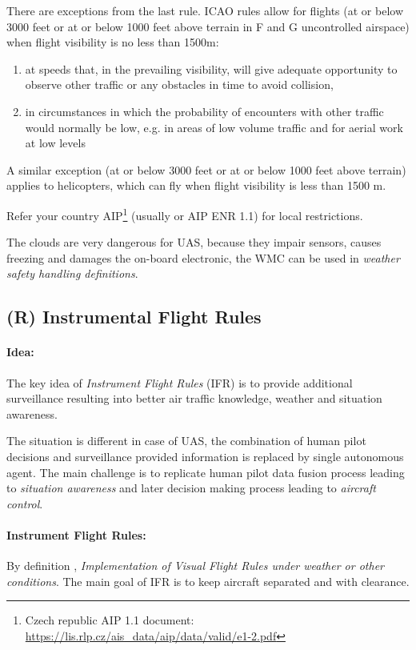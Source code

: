 There are exceptions from the last rule. ICAO rules allow for flights (at or below 3000 feet or at or below 1000 feet above terrain in F and G uncontrolled airspace) when flight visibility is no less than 1500m:
\begin{enumerate}
    \item at speeds that, in the prevailing visibility, will give adequate opportunity to observe other traffic or any obstacles in time to avoid collision,
    
    \item in circumstances in which the probability of encounters with other traffic would normally be low, e.g. in areas of low volume traffic and for aerial work at low levels
\end{enumerate}

A similar exception (at or below 3000 feet or at or below 1000 feet above terrain) applies to helicopters, which can fly when flight visibility is less than 1500 m.

Refer your country AIP\footnote{Czech republic AIP 1.1 document: \url{https://lis.rlp.cz/ais_data/aip/data/valid/e1-2.pdf}} (usually  or AIP ENR 1.1) for local restrictions.

\begin{note}
    The clouds are very dangerous for UAS, because they impair sensors, causes freezing and damages the on-board electronic, the WMC can be used in \emph{weather safety handling definitions}.
\end{note}

\subsection{(R) Instrumental Flight Rules}\label{sec:InstrumentalFlightRules}
\paragraph{Idea:} The key idea of \emph{Instrument Flight Rules} (IFR) is to provide additional surveillance resulting into better air traffic knowledge, weather and situation awareness. 

The situation is different in case of UAS, the combination of human pilot decisions and surveillance provided information is replaced by single autonomous agent. The main challenge is to replicate human pilot data fusion process leading to \emph{situation awareness} and later decision making process leading to \emph{aircraft control}.

\paragraph{Instrument Flight Rules:} By definition \cite{icaoAnnex2}, \emph{Implementation of Visual Flight Rules under weather or other conditions}. The main goal of IFR is to keep aircraft separated and with clearance.

